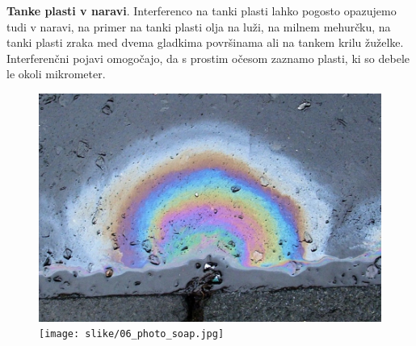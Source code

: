 \begin{example}{\bf Tanke plasti v naravi}.
Interferenco na tanki plasti lahko pogosto opazujemo tudi v naravi, na primer
na tanki plasti olja na luži, na milnem mehurčku, na tanki plasti zraka med 
dvema gladkima površinama ali na tankem krilu žuželke. 
Interferenčni pojavi omogočajo, da s prostim očesom zaznamo plasti, ki so 
debele le okoli mikrometer.
\begin{figure}[!h]
\centering
\includegraphics[width=7truecm]{slike/06_photo_oil.jpg}\hfill
\texttt{[image: slike/06\_photo\_soap.jpg]}\newline


\end{figure}
\end{example}
